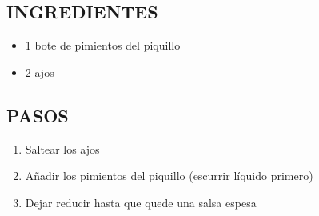 
\subsection*{INGREDIENTES}
\begin{itemize}
    \item 1 bote de pimientos del piquillo
    \item 2 ajos
\end{itemize}

\subsection*{PASOS}
\begin{enumerate}
    \item Saltear los ajos
    \item Añadir los pimientos del piquillo (escurrir líquido primero)
    \item Dejar reducir hasta que quede una salsa espesa
\end{enumerate}
